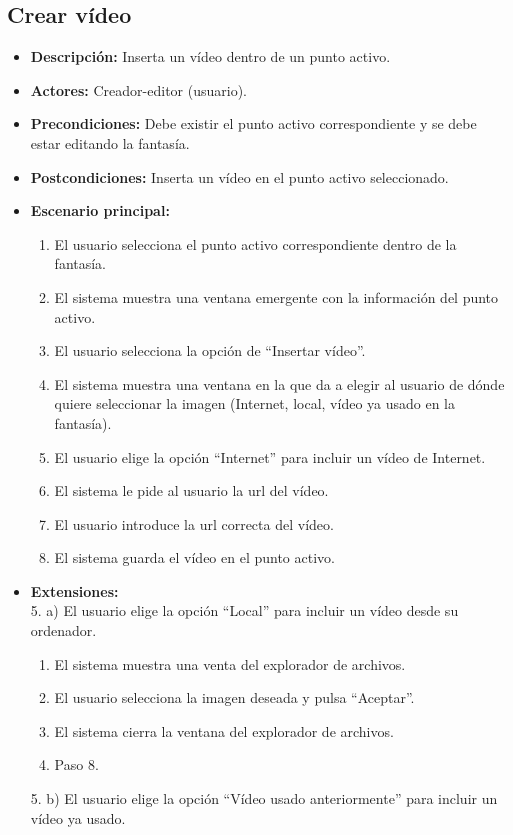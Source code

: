 \subsection{Crear vídeo}
\begin{itemize}
	\item \textbf{Descripción:} Inserta un vídeo dentro de un punto activo.
	\item \textbf{Actores:} Creador-editor (usuario).
	\item \textbf{Precondiciones:} Debe existir el punto activo correspondiente y se debe estar editando la fantasía.
	\item \textbf{Postcondiciones:} Inserta un vídeo en el punto activo seleccionado.
	\item \textbf{Escenario principal:}
	\begin{enumerate}
		\item El usuario selecciona el punto activo correspondiente dentro de la fantasía.
		\item El sistema muestra una ventana emergente con la información del punto activo.
		\item El usuario selecciona la opción de ``Insertar vídeo''.
		\item El sistema muestra una ventana en la que da a elegir al usuario de dónde quiere seleccionar la imagen (Internet, local, vídeo ya usado en la fantasía).
		\item El usuario elige la opción ``Internet'' para incluir un vídeo de Internet.
		\item El sistema le pide al usuario la url del vídeo.
		\item El usuario introduce la url correcta del vídeo.
		\item El sistema guarda el vídeo en el punto activo.
	\end{enumerate}
	\item \textbf{Extensiones:} \\ 5. a) El usuario elige la opción ``Local'' para incluir un vídeo desde su ordenador.
	\begin{enumerate}
		\item El sistema muestra una venta del explorador de archivos.
		\item El usuario selecciona la imagen deseada y pulsa ``Aceptar''.
		\item El sistema cierra la ventana del explorador de archivos.
		\item Paso 8.
	\end{enumerate}
	5. b) El usuario elige la opción ``Vídeo usado anteriormente'' para incluir un vídeo ya usado.

\end{itemize}
